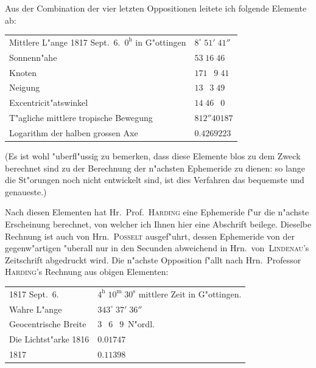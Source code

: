 \documentclass[12pt,a4paper]{article}
\begin{document}
Aus der Combination der vier letzten Oppositionen leitete ich folgende Elemente ab:

\newpage

\begin{center}
\begin{tabular}{l@{\dotfill}l}
Mittlere L"ange 1817 Sept.~6.\ $0^{\mathrm{h}}$ in G"ottingen & $8^{\circ}\;51'\;41''$ \\
Sonnenn"ahe & $53\;16\;46$ \\
Knoten & $171\;\phantom{0}9\;41$ \\
Neigung & $13\;\phantom{0}3\;49$ \\
Excentricit"atswinkel & $14\;46\;\phantom{0}0$ \\
T"agliche mittlere tropische Bewegung & $812''40187$ \\
Logarithm der halben grossen Axe & $0.4269223$ \\
\end{tabular}
\end{center}

(Es ist wohl "uberfl"ussig zu bemerken, dass diese Elemente blos zu dem Zweck berechnet sind
zu der Berechnung der n"achsten Ephemeride zu dienen: so lange die St"orungen noch nicht entwickelt
sind, ist dies Verfahren das bequemste und genaueste.)

Nach diesen Elementen hat Hr.~Prof.~\textsc{Harding} eine Ephemeride f"ur die n"achste Erscheinung berechnet,
von welcher ich Ihnen hier eine Abschrift beilege. Dieselbe Rechnung ist auch von Hrn.~\textsc{Posselt}
ausgef"uhrt, dessen Ephemeride von der gegenw"artigen "uberall nur in den Secunden abweichend
in Hrn.~von~\textsc{Lindenau}'s Zeitschrift abgedruckt wird. Die n"achste Opposition f"allt nach Hrn.~Professor
\textsc{Harding}'s Rechnung aus obigen Elementen:

\begin{center}
\begin{tabular}{l@{\quad}l}
1817 Sept.~6. & $4^{\mathrm{h}}\;10^{\mathrm{m}}\;30^{\mathrm{s}}$ mittlere Zeit in G"ottingen. \\
Wahre L"ange \dotfill & $343^{\circ}\;37'\;36''$ \\
Geocentrische Breite \dotfill & $3\;\phantom{0}6\;\phantom{0}9$~N"ordl. \\
Die Lichtst"arke 1816 \dotfill & $0.01747$ \\
\phantom{Die Lichtst"arke} 1817 \dotfill & $0.11398$ \\
\end{tabular}
\end{center}
\end{document}
